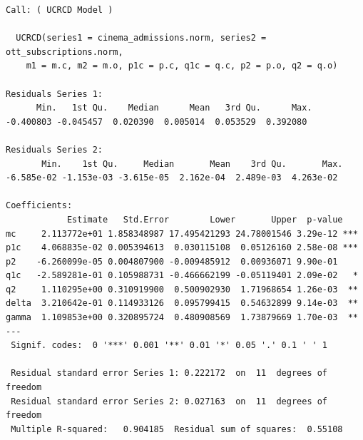 \documentclass[
]{article}
\begin{document}
\begin{verbatim}
Call: ( UCRCD Model )

  UCRCD(series1 = cinema_admissions.norm, series2 = ott_subscriptions.norm, 
    m1 = m.c, m2 = m.o, p1c = p.c, q1c = q.c, p2 = p.o, q2 = q.o)

Residuals Series 1:
      Min.   1st Qu.    Median      Mean   3rd Qu.      Max. 
-0.400803 -0.045457  0.020390  0.005014  0.053529  0.392080 

Residuals Series 2:
       Min.    1st Qu.     Median       Mean    3rd Qu.       Max. 
-6.585e-02 -1.153e-03 -3.615e-05  2.162e-04  2.489e-03  4.263e-02 

Coefficients:
            Estimate   Std.Error        Lower       Upper  p-value    
mc     2.113772e+01 1.858348987 17.495421293 24.78001546 3.29e-12 ***
p1c    4.068835e-02 0.005394613  0.030115108  0.05126160 2.58e-08 ***
p2    -6.260099e-05 0.004807900 -0.009485912  0.00936071 9.90e-01    
q1c   -2.589281e-01 0.105988731 -0.466662199 -0.05119401 2.09e-02   *
q2     1.110295e+00 0.310919900  0.500902930  1.71968654 1.26e-03  **
delta  3.210642e-01 0.114933126  0.095799415  0.54632899 9.14e-03  **
gamma  1.109853e+00 0.320895724  0.480908569  1.73879669 1.70e-03  **
---
 Signif. codes:  0 '***' 0.001 '**' 0.01 '*' 0.05 '.' 0.1 ' ' 1

 Residual standard error Series 1: 0.222172  on  11  degrees of freedom
 Residual standard error Series 2: 0.027163  on  11  degrees of freedom
 Multiple R-squared:   0.904185  Residual sum of squares:  0.55108
\end{verbatim}
\end{document}
